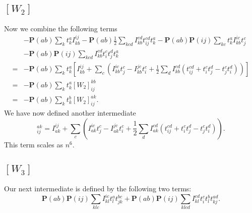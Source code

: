 \documentclass[a4paper,norsk,11pt,twoside]{report}
\begin{document}
\subsection{$[W_2]$}
Now we combine the following terms
\begin{align}
& - \textbf{P}(ab) \sum_k t_k^a I_{kb}^{ij}
- \textbf{P}(ab) \frac{1}{2} \sum_{kcd} I_{kb}^{cd} t_{ij}^{cd} t_k^a
- \textbf{P}(ab) \textbf{P}(ij) \sum_{kc} t_k^a I_{kb}^{ic} t_j^c 
\nonumber \\
& - \textbf{P}(ab) \textbf{P}(ij) \sum_{kcd} I_{kb}^{cd} t_i^c t_j^d t_k^a
\nonumber \\
= &
- \textbf{P}(ab) \sum_k t_k^a \left[
I_{kb}^{ij} 
+ \sum_c \left( I_{kb}^{ic} t_j^c
- I_{kb}^{jc} t_i^c
+ \frac{1}{2} \sum_{d} I_{kb}^{cd} (t_{ij}^{cd}
+ t_i^c t_j^d - t_j^c t_i^d
) \right) \right]
\nonumber \\
= &
- \textbf{P}(ab) \sum_k t_k^a [W_2]_{ij}^{kb} \nonumber \\
= &
- \textbf{P}(ab) \sum_k t_k^b [W_2]_{ij}^{ak} .
\end{align}
We have now defined another intermediate
\begin{equation}
[W_2]_{ij}^{ak} = I_{ak}^{ij} 
+ \sum_c \left( I_{ak}^{ic} t_j^c
- I_{ak}^{jc} t_i^c
+ \frac{1}{2} \sum_{d} I_{ak}^{cd} (t_{ij}^{cd}
+ t_i^c t_j^d - t_j^c t_i^d
) \right) . \label{intermedW2}
\end{equation}
This term scales as $n^6$.

\subsection{$[W_3]$}
Our next intermediate is defined by the following two terms:
\begin{equation}
\textbf{P}(ab) \textbf{P}(ij) \sum_{klc} I_{kl}^{ic} t_l^a t_{jk}^{bc}
+ \textbf{P}(ab) \textbf{P}(ij) \sum_{klcd} I_{kl}^{cd} t_i^c t_l^b t_{kj}^{ad} .
\end{equation}
\end{document}
